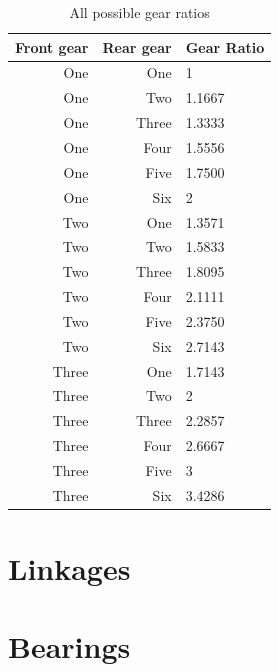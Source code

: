 \documentclass[11pt]{article}
\begin{document}
\begin{table}[H]
	\centering
	\begin{tabular}{|r|r|l|}
		\hline
		\textbf{Front gear} & \textbf{Rear gear} & \textbf{Gear Ratio} \\
		\hline
		One & One & 1 \\
		One & Two & 1.1667 \\
		One & Three & 1.3333 \\
		One & Four & 1.5556 \\
		One & Five & 1.7500 \\
		One & Six & 2 \\
		\hline
		Two & One & 1.3571 \\
		Two & Two & 1.5833 \\
		Two & Three & 1.8095 \\
		Two & Four & 2.1111 \\
		Two & Five & 2.3750 \\
		Two & Six & 2.7143 \\
		\hline
		Three & One & 1.7143 \\
		Three & Two & 2 \\
		Three & Three & 2.2857 \\
		Three & Four & 2.6667 \\
		Three & Five & 3 \\
		Three & Six & 3.4286 \\
		\hline
	\end{tabular}
	\caption{All possible gear ratios}
\end{table}

\section*{Linkages}

\section*{Bearings}
\end{document}
